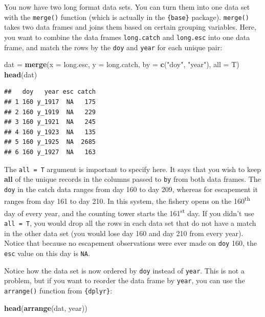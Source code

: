\documentclass[]{book}
\newenvironment{Shaded}{\begin{snugshade}}{\end{snugshade}}
\newcommand{\DataTypeTok}[1]{\textcolor[rgb]{0.13,0.29,0.53}{#1}}
\newcommand{\KeywordTok}[1]{\textcolor[rgb]{0.13,0.29,0.53}{\textbf{#1}}}
\newcommand{\NormalTok}[1]{#1}
\newcommand{\StringTok}[1]{\textcolor[rgb]{0.31,0.60,0.02}{#1}}
\begin{document}
You now have two long format data sets. You can turn them into one data set with the \texttt{merge()} function (which is actually in the \texttt{\{base\}} package). \texttt{merge()} takes two data frames and joins them based on certain grouping variables. Here, you want to combine the data frames \texttt{long.catch} and \texttt{long.esc} into one data frame, and match the rows by the \texttt{doy} and \texttt{year} for each unique pair:

\begin{Shaded}
\begin{Highlighting}[]
\NormalTok{dat =}\StringTok{ }\KeywordTok{merge}\NormalTok{(}\DataTypeTok{x =}\NormalTok{ long.esc, }\DataTypeTok{y =}\NormalTok{ long.catch,}
            \DataTypeTok{by =} \KeywordTok{c}\NormalTok{(}\StringTok{"doy"}\NormalTok{, }\StringTok{"year"}\NormalTok{), }\DataTypeTok{all =}\NormalTok{ T)}
\KeywordTok{head}\NormalTok{(dat)}
\end{Highlighting}
\end{Shaded}

\begin{verbatim}
##   doy   year esc catch
## 1 160 y_1917  NA   175
## 2 160 y_1919  NA   229
## 3 160 y_1921  NA   245
## 4 160 y_1923  NA   135
## 5 160 y_1925  NA  2685
## 6 160 y_1927  NA   163
\end{verbatim}

The \texttt{all\ =\ T} argument is important to specify here. It says that you wish to keep \textbf{all} of the unique records in the columns passed to \texttt{by} from both data frames. The \texttt{doy} in the catch data ranges from day 160 to day 209, whereas for escapement it ranges from day 161 to day 210. In this system, the fishery opens on the 160\textsuperscript{th} day of every year, and the counting tower starts the 161\textsuperscript{st} day. If you didn't use \texttt{all\ =\ T}, you would drop all the rows in each data set that do not have a match in the other data set (you would lose day 160 and day 210 from every year). Notice that because no escapement observations were ever made on \texttt{doy} 160, the \texttt{esc} value on this day is \texttt{NA}.

Notice how the data set is now ordered by \texttt{doy} instead of \texttt{year}. This is not a problem, but if you want to reorder the data frame by \texttt{year}, you can use the \texttt{arrange()} function from \texttt{\{dplyr\}}:

\begin{Shaded}
\begin{Highlighting}[]
\KeywordTok{head}\NormalTok{(}\KeywordTok{arrange}\NormalTok{(dat, year))}
\end{Highlighting}
\end{Shaded}
\end{document}
